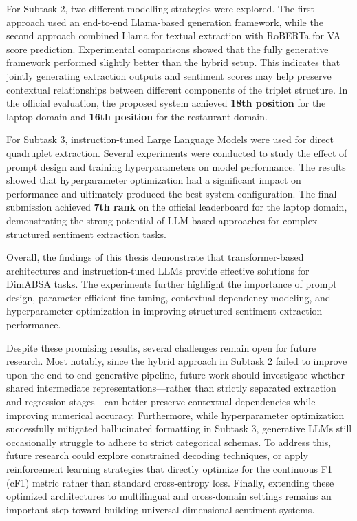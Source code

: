 \documentclass{article}
\begin{document}
For Subtask 2, two different modelling strategies were explored. The first approach used an end-to-end Llama-based generation framework, while the second approach combined Llama for textual extraction with RoBERTa for VA score prediction. Experimental comparisons showed that the fully generative framework performed slightly better than the hybrid setup. This indicates that jointly generating extraction outputs and sentiment scores may help preserve contextual relationships between different components of the triplet structure. In the official evaluation, the proposed system achieved \textbf{18th position} for the laptop domain and \textbf{16th position} for the restaurant domain.

For Subtask 3, instruction-tuned Large Language Models were used for direct quadruplet extraction. Several experiments were conducted to study the effect of prompt design and training hyperparameters on model performance. The results showed that hyperparameter optimization had a significant impact on performance and ultimately produced the best system configuration. The final submission achieved \textbf{7th rank} on the official leaderboard for the laptop domain, demonstrating the strong potential of LLM-based approaches for complex structured sentiment extraction tasks.

Overall, the findings of this thesis demonstrate that transformer-based architectures and instruction-tuned LLMs provide effective solutions for DimABSA tasks. The experiments further highlight the importance of prompt design, parameter-efficient fine-tuning, contextual dependency modeling, and hyperparameter optimization in improving structured sentiment extraction performance.

Despite these promising results, several challenges remain open for future research. Most notably, since the hybrid approach in Subtask 2 failed to improve upon the end-to-end generative pipeline, future work should investigate whether shared intermediate representations—rather than strictly separated extraction and regression stages—can better preserve contextual dependencies while improving numerical accuracy. Furthermore, while hyperparameter optimization successfully mitigated hallucinated formatting in Subtask 3, generative LLMs still occasionally struggle to adhere to strict categorical schemas. To address this, future research could explore constrained decoding techniques, or apply reinforcement learning strategies that directly optimize for the continuous F1 (cF1) metric rather than standard cross-entropy loss. Finally, extending these optimized architectures to multilingual and cross-domain settings remains an important step toward building universal dimensional sentiment systems.
\end{document}
